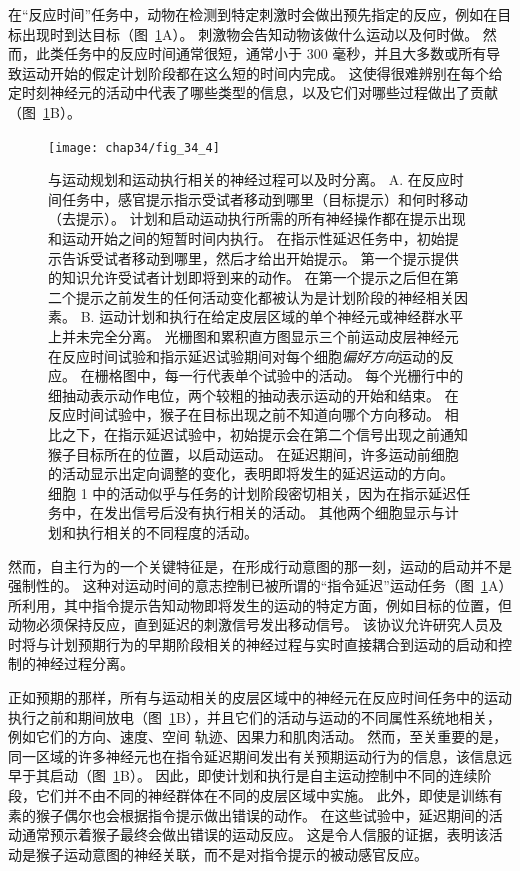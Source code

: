在“反应时间”任务中，动物在检测到特定刺激时会做出预先指定的反应，例如在目标出现时到达目标（图~\ref{fig:34_4}A）。 
刺激物会告知动物该做什么运动以及何时做。
然而，此类任务中的反应时间通常很短，通常小于 300 毫秒，并且大多数或所有导致运动开始的假定计划阶段都在这么短的时间内完成。
这使得很难辨别在每个给定时刻神经元的活动中代表了哪些类型的信息，以及它们对哪些过程做出了贡献（图~\ref{fig:34_4}B）。


\begin{figure}[htbp]
	\centering
	\texttt{[image: chap34/fig\_34\_4]}
	\caption{与运动规划和运动执行相关的神经过程可以及时分离\cite{crammond2000prior}。
		A. 在反应时间任务中，感官提示指示受试者移动到哪里（目标提示）和何时移动（去提示）。
		计划和启动运动执行所需的所有神经操作都在提示出现和运动开始之间的短暂时间内执行。
		在指示性延迟任务中，初始提示告诉受试者移动到哪里，然后才给出开始提示。
		第一个提示提供的知识允许受试者计划即将到来的动作。
		在第一个提示之后但在第二个提示之前发生的任何活动变化都被认为是计划阶段的神经相关因素。
		B. 运动计划和执行在给定皮层区域的单个神经元或神经群水平上并未完全分离。
		光栅图和累积直方图显示三个前运动皮层神经元在反应时间试验和指示延迟试验期间对每个细胞\textit{偏好方向}运动的反应。
		在栅格图中，每一行代表单个试验中的活动。
		每个光栅行中的细抽动表示动作电位，两个较粗的抽动表示运动的开始和结束。
		在反应时间试验中，猴子在目标出现之前不知道向哪个方向移动。
		相比之下，在指示延迟试验中，初始提示会在第二个信号出现之前通知猴子目标所在的位置，以启动运动。
		在延迟期间，许多运动前细胞的活动显示出定向调整的变化，表明即将发生的延迟运动的方向。
		细胞 1 中的活动似乎与任务的计划阶段密切相关，因为在指示延迟任务中，在发出信号后没有执行相关的活动。
		其他两个细胞显示与计划和执行相关的不同程度的活动。}
	\label{fig:34_4}
\end{figure}


然而，自主行为的一个关键特征是，在形成行动意图的那一刻，运动的启动并不是强制性的。
这种对运动时间的意志控制已被所谓的“指令延迟”运动任务（图~\ref{fig:34_4}A）所利用，其中指令提示告知动物即将发生的运动的特定方面，例如目标的位置，但动物必须保持反应，直到延迟的刺激信号发出移动信号。
该协议允许研究人员及时将与计划预期行为的早期阶段相关的神经过程与实时直接耦合到运动的启动和控制的神经过程分离。


正如预期的那样，所有与运动相关的皮层区域中的神经元在反应时间任务中的运动执行之前和期间放电（图~\ref{fig:34_4}B），并且它们的活动与运动的不同属性系统地相关，例如它们的方向、速度、空间 轨迹、因果力和肌肉活动。
然而，至关重要的是，同一区域的许多神经元也在指令延迟期间发出有关预期运动行为的信息，该信息远早于其启动（图~\ref{fig:34_4}B）。
因此，即使计划和执行是自主运动控制中不同的连续阶段，它们并不由不同的神经群体在不同的皮层区域中实施。
此外，即使是训练有素的猴子偶尔也会根据指令提示做出错误的动作。
在这些试验中，延迟期间的活动通常预示着猴子最终会做出错误的运动反应。
这是令人信服的证据，表明该活动是猴子运动意图的神经关联，而不是对指令提示的被动感官反应。



